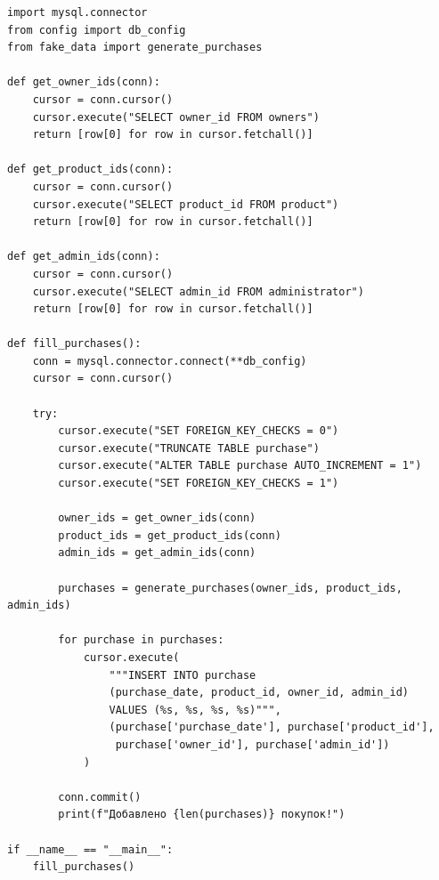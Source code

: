 \documentclass[a4paper]{article}
\begin{document}
\begin{lstlisting}[caption = Заполнение таблицы Purchase, basicstyle= \scriptsize \ttfamily]
import mysql.connector
from config import db_config
from fake_data import generate_purchases

def get_owner_ids(conn):
    cursor = conn.cursor()
    cursor.execute("SELECT owner_id FROM owners")
    return [row[0] for row in cursor.fetchall()]

def get_product_ids(conn):
    cursor = conn.cursor()
    cursor.execute("SELECT product_id FROM product")
    return [row[0] for row in cursor.fetchall()]

def get_admin_ids(conn):
    cursor = conn.cursor()
    cursor.execute("SELECT admin_id FROM administrator")
    return [row[0] for row in cursor.fetchall()]

def fill_purchases():
    conn = mysql.connector.connect(**db_config)
    cursor = conn.cursor()
    
    try:
        cursor.execute("SET FOREIGN_KEY_CHECKS = 0")
        cursor.execute("TRUNCATE TABLE purchase")
        cursor.execute("ALTER TABLE purchase AUTO_INCREMENT = 1")
        cursor.execute("SET FOREIGN_KEY_CHECKS = 1")

        owner_ids = get_owner_ids(conn)
        product_ids = get_product_ids(conn)
        admin_ids = get_admin_ids(conn)

        purchases = generate_purchases(owner_ids, product_ids, admin_ids)
        
        for purchase in purchases:
            cursor.execute(
                """INSERT INTO purchase 
                (purchase_date, product_id, owner_id, admin_id)
                VALUES (%s, %s, %s, %s)""",
                (purchase['purchase_date'], purchase['product_id'], 
                 purchase['owner_id'], purchase['admin_id'])
            )
        
        conn.commit()
        print(f"Добавлено {len(purchases)} покупок!")

if __name__ == "__main__":
    fill_purchases()
\end{lstlisting}
\end{document}
